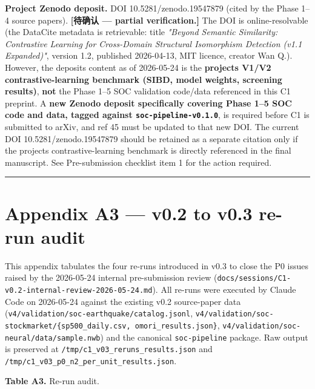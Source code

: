 \documentclass[
  11pt]{article}
\begin{document}
\textbf{Project Zenodo deposit.} DOI 10.5281/zenodo.19547879 (cited by
the Phase 1--4 source papers). \textbf{{[}待确认 --- partial
verification.{]}} The DOI is online-resolvable (the DataCite metadata is
retrievable: title \emph{"Beyond Semantic Similarity: Contrastive
Learning for Cross-Domain Structural Isomorphism Detection (v1.1
Expanded)"}, version 1.2, published 2026-04-13, MIT licence, creator Wan
Q.). However, the deposit\textquotesingle s content as of 2026-05-24 is
the \textbf{project\textquotesingle s V1/V2 contrastive-learning
benchmark (SIBD, model weights, screening results)}, \textbf{not} the
Phase 1--5 SOC validation code/data referenced in this C1 preprint. A
\textbf{new Zenodo deposit specifically covering Phase 1--5 SOC code and
data, tagged against \texttt{soc-pipeline-v0.1.0}}, is required before
C1 is submitted to arXiv, and ref 45 must be updated to that new DOI.
The current DOI 10.5281/zenodo.19547879 should be retained as a separate
citation only if the project\textquotesingle s contrastive-learning
benchmark is directly referenced in the final manuscript. See
Pre-submission checklist item 1 for the action required.

\begin{center}\rule{0.5\linewidth}{0.5pt}\end{center}

\section*{Appendix A3 --- v0.2 to v0.3 re-run audit}\label{appendix-a3--v02--v03-re-run-audit}

This appendix tabulates the four re-runs introduced in v0.3 to close the
P0 issues raised by the 2026-05-24 internal pre-submission review
(\texttt{docs/sessions/C1-v0.2-internal-review-2026-05-24.md}). All
re-runs were executed by Claude Code on 2026-05-24 against the existing
v0.2 source-paper data
(\texttt{v4/validation/soc-earthquake/catalog.jsonl},
\texttt{v4/validation/soc-stockmarket/\{sp500\_daily.csv,\ omori\_results.json\}},
\texttt{v4/validation/soc-neural/data/sample.nwb}) and the canonical
\texttt{soc-pipeline} package. Raw output is preserved at
\texttt{/tmp/c1\_v03\_reruns\_results.json} and
\texttt{/tmp/c1\_v03\_p0\_n2\_per\_unit\_results.json}.

\textbf{Table A3.} Re-run audit.
\end{document}
